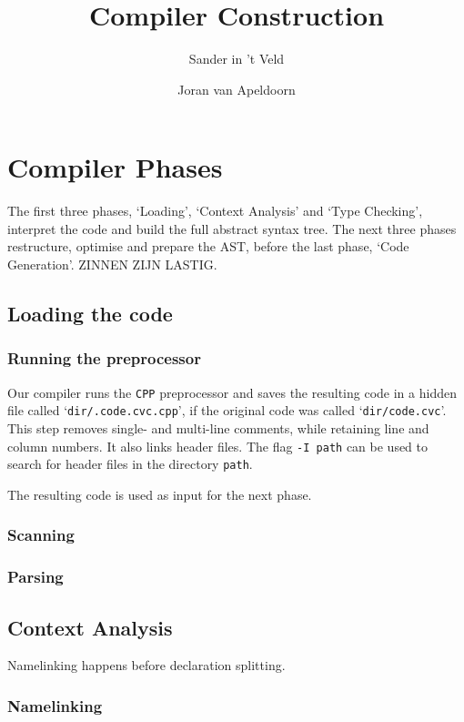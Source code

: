 \documentclass[a4paper,11pt]{report}
\title{Compiler Construction}
\author{Sander in 't Veld \and Joran van Apeldoorn}
\begin{document}
\maketitle
\tableofcontents


\chapter{Compiler Phases}
The first three phases, `Loading', `Context Analysis' and `Type Checking', interpret the code and build the full abstract syntax tree. The next three phases restructure, optimise and prepare the AST, before the last phase, `Code Generation'. ZINNEN ZIJN LASTIG.

\section{Loading the code}
\subsection{Running the preprocessor}
Our compiler runs the \texttt{CPP} preprocessor and saves the resulting code in a hidden file called `\texttt{dir/.code.cvc.cpp}', if the original code was called `\texttt{dir/code.cvc}'. This step removes single- and multi-line comments, while retaining line and column numbers. It also links header files. The flag \texttt{-I path} can be used to search for header files in the directory \texttt{path}.

The resulting code is used as input for the next phase.

\subsection{Scanning}

\subsection{Parsing}

\section{Context Analysis}
Namelinking happens before declaration splitting.
\subsection{Namelinking}
\end{document}
